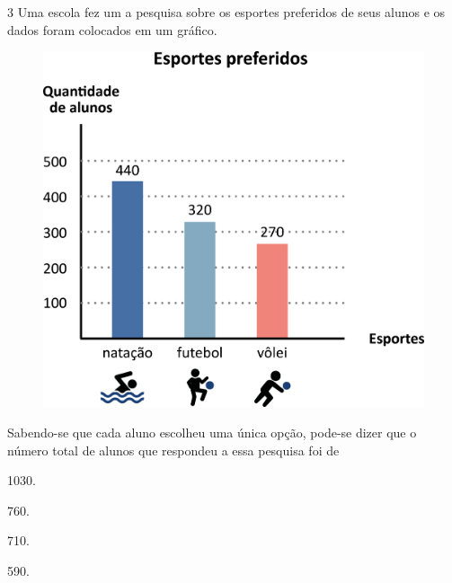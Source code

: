 \pagebreak
\num{3} Uma escola fez um a pesquisa sobre os esportes preferidos de seus alunos
e os dados foram colocados em um gráfico.

\begin{figure}[htpb!]
\centering
\includegraphics[width=\textwidth]{./media/image90.png}
\end{figure}

Sabendo-se que cada aluno escolheu uma única opção, pode-se dizer que o
número total de alunos que respondeu a essa pesquisa foi de

\begin{multicols}{2}
\begin{escolha}
\item
  1030.
\item
  760.
\item
  710.
\item
  590.
\end{escolha}
\end{multicols}

